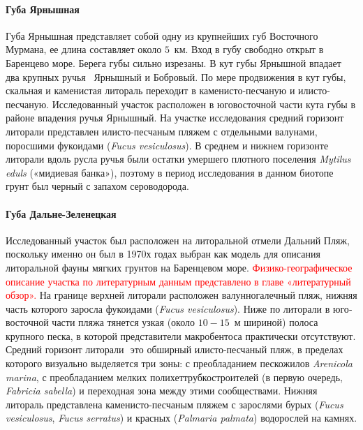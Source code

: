 \documentclass[12pt, a4paper]{disser}
\begin{document}
    \paragraph{Губа Ярнышная}
Губа Ярнышная представляет собой одну из крупнейших губ Восточного Мурмана, ее длина составляет около $5$~км. 
Вход в губу свободно открыт в Баренцево море. 
Берега губы сильно изрезаны. 
В кут губы Ярнышной впадает два крупных ручья \textemdash\ Ярнышный и Бобровый. 
По мере продвижения в кут губы, скальная и каменистая литораль переходит в каменисто-песчаную и илисто-песчаную. 
Исследованный участок расположен в юго­восточной части кута губы в районе впадения ручья Ярнышный.
На   участке   исследования   средний   горизонт   литорали   представлен   илисто-песчаным пляжем   с   отдельными   валунами,   поросшими   фукоидами   ({\it Fucus   vesiculosus}).   
В   среднем   и нижнем горизонте литорали вдоль русла ручья были остатки умершего плотного поселения  {\it Mytilus eduls} («мидиевая банка»), поэтому в период исследования в данном биотопе грунт был черный с запахом сероводорода.

    \paragraph{Губа Дальне-Зеленецкая}
Исследованный   участок   был   расположен   на   литоральной   отмели   Дальний   Пляж, поскольку именно он был в 1970х годах выбран как модель для описания литоральной фауны мягких   грунтов   на   Баренцевом   море.   
\textcolor{red}{Физико-географическое   описание   участка   по литературным данным представлено в главе «литературный обзор».}
На   границе   верхней   литорали   расположен   валунно­галечный   пляж,   нижняя   часть которого заросла фукоидами ({\it Fucus vesiculosus}). 
Ниже по литорали в юго­восточной части пляжа   тянется   узкая   (около   $10-15$~м   шириной)   полоса   крупного   песка,   в   которой представители макробентоса практически отсутствуют.
Средний   горизонт   литорали    ­   это   обширный   илисто-песчаный   пляж,   в  пределах которого визуально выделяется три зоны: с преобладанием пескожилов  {\it Arenicola marina}, с преобладанием   мелких   полихет­трубкостроителей   (в   первую   очередь, {\it Fabricia   sabella})   и переходная   зона   между   этими   сообществами.   
Нижняя   литораль   представлена   каменисто-песчаным пляжем с зарослями бурых ({\it Fucus vesiculosus}, {\it Fucus serratus}) и красных ({\it Palmaria  palmata}) водорослей на камнях.
\end{document}
